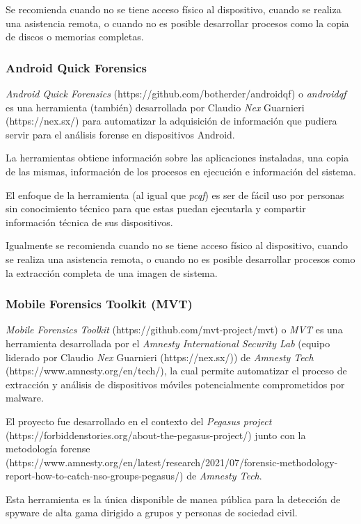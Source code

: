 \documentclass[12pt]{caltech_thesis}
\begin{document}
Se recomienda cuando no se tiene acceso físico al dispositivo, cuando se realiza una asistencia remota, o cuando no es posible desarrollar procesos como la copia de discos o memorias completas.

\subsubsection{Android Quick Forensics}

\textit{Android Quick Forensics} (https://github.com/botherder/androidqf) o \textit{androidqf} es una herramienta (también) desarrollada por Claudio \textit{Nex} Guarnieri (https://nex.sx/) para automatizar la adquisición de información que pudiera servir para el análisis forense en dispositivos Android.

La herramientas obtiene información sobre las aplicaciones instaladas, una copia de las mismas, información de los procesos en ejecución e información del sistema.

El enfoque de la herramienta (al igual que \textit{pcqf}) es ser de fácil uso por personas sin conocimiento técnico para que estas puedan ejecutarla y compartir información técnica de sus dispositivos.

Igualmente se recomienda cuando no se tiene acceso físico al dispositivo, cuando se realiza una asistencia remota, o cuando no es posible desarrollar procesos como la extracción completa de una imagen de sistema.

\subsubsection{Mobile Forensics Toolkit (MVT)}

\textit{Mobile Forensics Toolkit} (https://github.com/mvt-project/mvt) o \textit{MVT} es una herramienta desarrollada por el \textit{Amnesty International Security Lab} (equipo liderado por Claudio \textit{Nex} Guarnieri (https://nex.sx/)) de \textit{Amnesty Tech} (https://www.amnesty.org/en/tech/), la cual permite automatizar el proceso de extracción y análisis de dispositivos móviles potencialmente comprometidos por malware.

El proyecto fue desarrollado en el contexto del \textit{Pegasus project} (https://forbiddenstories.org/about-the-pegasus-project/) junto con la metodología forense (https://www.amnesty.org/en/latest/research/2021/07/forensic-methodology-report-how-to-catch-nso-groups-pegasus/) de \textit{Amnesty Tech}.

Esta herramienta es la única disponible de manea pública para la detección de spyware de alta gama dirigido a grupos y personas de sociedad civil.
\end{document}
